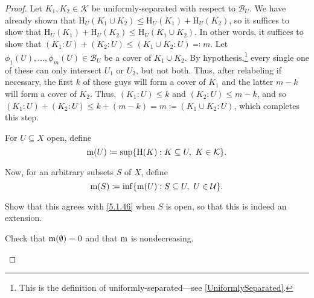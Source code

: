 \begin{thm}
\begin{savenotes}
\begin{proof}
\label{Haar.8}
Let $K_1,K_2\in \mathcal{K}$ be uniformly-separated with respect to $\mathcal{B}_U$.  We have already shown that $\mathrm{H}_U(K_1\cup K_2)\leq \mathrm{H}_U(K_1)+\mathrm{H}_U(K_2)$, so it suffices to show that $\mathrm{H}_U(K_1)+\mathrm{H}_U(K_2)\leq \mathrm{H}_U(K_1\cup K_2)$.  In other words, it suffices to show that $(K_1:U)+(K_2:U)\leq (K_1\cup K_2:U)\eqqcolon m$.  Let $\phi _1(U),\ldots ,\phi _m(U)\in \mathcal{B}_U$ be a cover of $K_1\cup K_2$.  By hypothesis,\footnote{This is the definition of uniformly-separated---see \cref{UniformlySeparated}.} every single one of these can only intersect $U_1$ or $U_2$, but not both.  Thus, after relabeling if necessary, the first $k$ of these guys will form a cover of $K_1$ and the latter $m-k$ will form a cover of $K_2$.  Thus, $(K_1:U)\leq k$ and $(K_2:U)\leq m-k$, and so $(K_1:U)+(K_2:U)\leq k+(m-k)=m\coloneqq (K_1\cup K_2:U)$, which completes this step.

For $U\subseteq X$ open, define
\begin{equation}\label{5.1.46}
\mathrm{m} (U)\coloneqq \sup \{ \mathrm{H}(K):K\subseteq U,\ K\in \mathcal{K}\} .
\end{equation}

Now, for an arbitrary subsets $S$ of $X$, define
\begin{equation}\label{5.1.38}
\mathrm{m} (S)\coloneqq \inf \{ \mathrm{m} (U):S\subseteq U,\ U\in \mathcal{U}\} .
\end{equation}
\begin{exr}
Show that this agrees with \eqref{5.1.46} when $S$ is open, so that this is indeed an extension.
\end{exr}

\begin{exr}
Check that $\mathrm{m} (\emptyset )=0$ and that $\mathrm{m}$ is nondecreasing.
\end{exr}


\end{proof}
\end{savenotes}
\end{thm}
